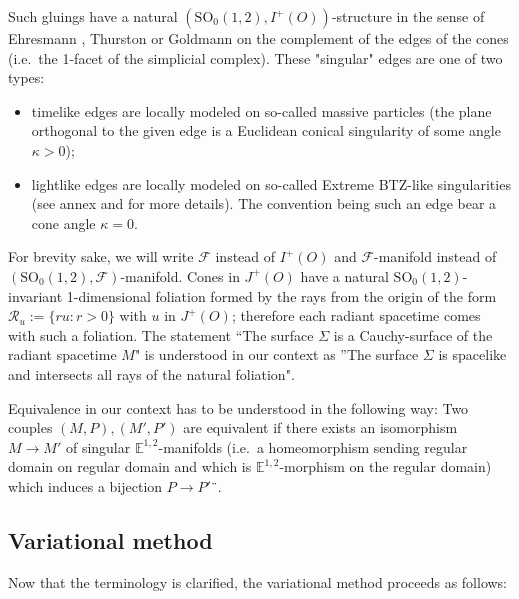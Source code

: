 \documentclass[a4paper,12pt]{article}
\def\SO{\mathrm{SO}}
\newcommand{\mass}[1]{{\mathbb E}^{1,2}_{#1}}
\def\SO{\mathrm{SO}}
\def\Future{\mathcal F}
\theoremstyle{definition}
\begin{document}
		
		Such gluings have a natural $(\SO_0(1,2),I^+(O))$-structure in the sense of Ehresmann \cite{MR794193}, Thurston or Goldmann \cite{MR957518} on the complement of the edges of the cones (i.e.\ the 1-facet of the simplicial complex). These "singular" edges are one of two types: 
		\begin{itemize}
		 \item timelike edges are locally modeled on so-called massive particles (the plane orthogonal to the given edge is a Euclidean conical singularity of some angle $\kappa>0$);
		 \item lightlike edges are locally modeled on so-called Extreme BTZ-like singularities (see annex and \cite{Particules_1} for more details). The convention being such an edge bear a cone angle $\kappa=0$.
		\end{itemize}
		For brevity sake, we will write $\Future$ instead of $I^+(O)$ and $\Future$-manifold instead of $(\SO_0(1,2),\Future)$-manifold.		
		Cones in $J^+(O)$ have a natural $\SO_0(1,2)$-invariant 1-dimensional foliation formed by the rays from the origin of the form $\mathcal R_u:= \{ru: r>0\}$ with $u$ in $J^+(O)$; therefore each radiant spacetime comes with such a foliation. The statement ``The surface $\Sigma$ is a Cauchy-surface of the radiant spacetime $M$" is understood in our context as ''The surface $\Sigma$ is spacelike and intersects all rays of the natural foliation". 
		
		
		
	Equivalence in our context has to be understood in the following way: 
	Two couples $(M,P),(M',P')$ are equivalent if there exists an isomorphism $M\rightarrow M'$ of singular $\mass{}$-manifolds (i.e.\ a homeomorphism sending regular domain on regular domain and which is $\mass{}$-morphism on the regular domain) which induces a bijection $P\rightarrow P'¨$.
	
		
	\subsection{Variational method}
		Now that the terminology is clarified, the variational method proceeds as follows: 
	
\end{document}
